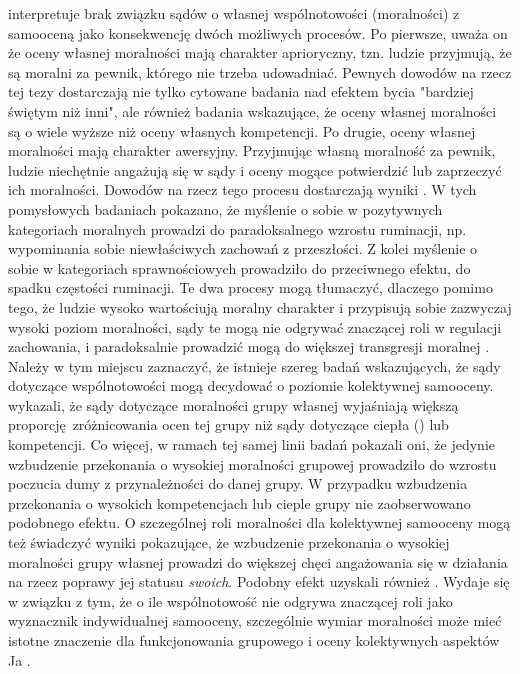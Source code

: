 \documentclass[man]{apa6}
\begin{document}
\textcite{wojciszke2010sprawczosc} interpretuje brak związku sądów o własnej wspólnotowości (moralności) z samooceną jako konsekwencję dwóch możliwych procesów. Po pierwsze, uważa on że oceny własnej moralności mają charakter aprioryczny, tzn. ludzie przyjmują, że są moralni za pewnik, którego nie trzeba udowadniać. Pewnych dowodów na rzecz tej tezy dostarczają nie tylko cytowane badania nad efektem bycia "bardziej świętym niż inni", ale również badania \textcite{wojciszke2010sprawczosc} wskazujące, że oceny własnej moralności są o wiele wyższe niż oceny własnych kompetencji. Po drugie, oceny własnej moralności mają charakter awersyjny. Przyjmując własną moralność za pewnik, ludzie niechętnie angażują się w sądy i oceny mogące potwierdzić lub zaprzeczyć ich moralności. Dowodów na rzecz tego procesu dostarczają wyniki \textcite{baryla2005wplyw}. W tych pomysłowych badaniach pokazano, że myślenie o sobie w pozytywnych kategoriach moralnych prowadzi do paradoksalnego wzrostu ruminacji, np. wypominania sobie niewłaściwych zachowań z przeszłości. Z kolei myślenie o sobie w kategoriach sprawnościowych prowadziło do przeciwnego efektu, do spadku częstości ruminacji. Te dwa procesy mogą tłumaczyć, dlaczego pomimo tego, że ludzie wysoko wartościują moralny charakter \parencite{gausel2011concern, goodwin2014moral} i przypisują sobie zazwyczaj wysoki poziom moralności, sądy te mogą nie odgrywać znaczącej roli w regulacji zachowania, i paradoksalnie prowadzić mogą do większej transgresji moralnej \parencite{merritt2010moral, monin2001moral, iyer2012sugaring}.\\

Należy w tym miejscu zaznaczyć, że istnieje szereg badań wskazujących, że sądy dotyczące wspólnotowości mogą decydować o poziomie kolektywnej samooceny. \textcite{leach2007group} wykazali, że sądy dotyczące moralności grupy własnej wyjaśniają większą proporcję zróżnicowania ocen tej grupy niż sądy dotyczące ciepła () lub kompetencji. Co więcej, w ramach tej samej linii badań pokazali oni, że jedynie wzbudzenie przekonania o wysokiej moralności grupowej prowadziło do wzrostu poczucia dumy z przynależności do danej grupy. W przypadku wzbudzenia przekonania o wysokich kompetencjach lub cieple grupy nie zaobserwowano podobnego efektu. O szczególnej roli moralności dla kolektywnej samooceny mogą też świadczyć wyniki \textcite{ellemers2008better} pokazujące, że wzbudzenie przekonania o wysokiej moralności grupy własnej prowadzi do większej chęci angażowania się w działania na rzecz poprawy jej statusu \emph{swoich}. Podobny efekt uzyskali również \textcite{pagliaro2011sharing}. Wydaje się w związku z tym, że o ile wspólnotowość nie odgrywa znaczącej roli jako wyznacznik indywidualnej samooceny, szczególnie wymiar moralności może mieć istotne znaczenie dla funkcjonowania grupowego i oceny kolektywnych aspektów Ja \parencite[patrz również,][]{ellemers2012morality, leach2013groups}.
\end{document}
